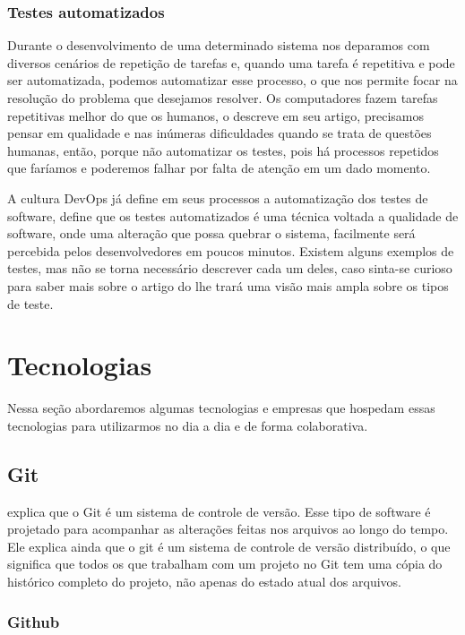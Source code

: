 \subsubsection{Testes automatizados}
 Durante o desenvolvimento de uma determinado sistema nos deparamos com diversos cenários de repetição de tarefas e, quando uma tarefa é repetitiva e pode ser automatizada, podemos automatizar esse processo, o que nos permite focar na resolução do problema que desejamos resolver. Os computadores fazem tarefas repetitivas melhor do que os humanos, o \cite{Bernardo2008} descreve em seu artigo, precisamos pensar em qualidade e nas inúmeras dificuldades quando se trata de questões humanas, então, porque não automatizar os testes, pois há processos repetidos que faríamos e poderemos falhar por falta de atenção em um dado momento.

A cultura DevOps já define em seus processos a automatização dos testes de software, \cite{Bernardo2008} define que os testes automatizados é uma técnica voltada a qualidade de software, onde uma alteração que possa quebrar o sistema, facilmente será percebida pelos desenvolvedores em poucos minutos. Existem alguns exemplos de testes, mas não se torna necessário descrever cada um deles, caso sinta-se curioso para saber mais sobre o artigo do \cite{Bernardo2008} lhe trará uma visão mais ampla sobre os tipos de teste.


\section{Tecnologias}

Nessa seção abordaremos algumas tecnologias e empresas que hospedam essas tecnologias para utilizarmos no dia a dia e de forma colaborativa.

\subsection{Git}

\cite{Beer2018} explica que o Git é um sistema de controle de versão. Esse tipo de software é projetado para acompanhar as alterações feitas nos arquivos ao longo do tempo. Ele explica ainda que o git é um sistema de controle de versão distribuído, o que significa que todos os que trabalham com um projeto no Git tem uma cópia do histórico completo do projeto, não apenas do estado atual dos arquivos.

\subsubsection{Github}

